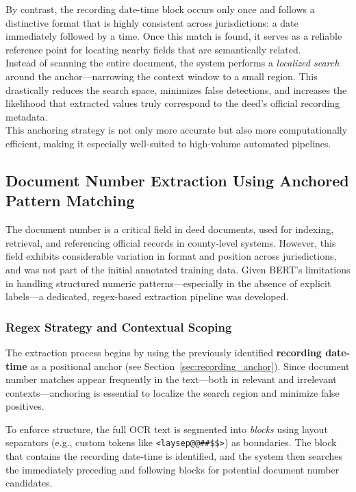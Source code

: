 \documentclass{article}
\begin{document}
By contrast, the recording date-time block occurs only once and follows a distinctive format that is highly consistent across jurisdictions: a date immediately followed by a time. Once this match is found, it serves as a reliable reference point for locating nearby fields that are semantically related. \\ 

Instead of scanning the entire document, the system performs a \textit{localized search} around the anchor—narrowing the context window to a small region. This drastically reduces the search space, minimizes false detections, and increases the likelihood that extracted values truly correspond to the deed's official recording metadata. \\

This anchoring strategy is not only more accurate but also more computationally efficient, making it especially well-suited to high-volume automated pipelines.

\subsection{Document Number Extraction Using Anchored Pattern Matching}

The document number is a critical field in deed documents, used for indexing, retrieval, and referencing official records in county-level systems. However, this field exhibits considerable variation in format and position across jurisdictions, and was not part of the initial annotated training data. Given BERT’s limitations in handling structured numeric patterns—especially in the absence of explicit labels—a dedicated, regex-based extraction pipeline was developed.

\subsubsection{Regex Strategy and Contextual Scoping}

The extraction process begins by using the previously identified \textbf{recording date-time} as a positional anchor (see Section~\ref{sec:recording_anchor}). Since document number matches appear frequently in the text—both in relevant and irrelevant contexts—anchoring is essential to localize the search region and minimize false positives.

To enforce structure, the full OCR text is segmented into \textit{blocks} using layout separators (e.g., custom tokens like \texttt{<laysep@@\#\#\$\$>}) as boundaries. The block that contains the recording date-time is identified, and the system then searches the immediately preceding and following blocks for potential document number candidates.
\end{document}

